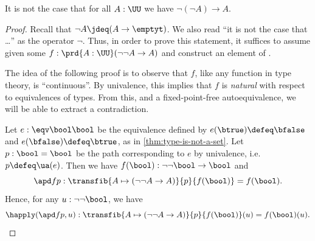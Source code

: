%
\begin{thm}\label{thm:not-dneg}
  It is not the case that for all $A:\UU$ we have $\neg(\neg A) \to A$.
\end{thm}

\begin{proof}
  Recall that $\neg A \jdeq (A\to\emptyt)$.
  We also read ``it is not the case that \dots'' as the operator $\neg$.
  Thus, in order to prove this statement, it suffices to assume given some $f:\prd{A:\UU} (\neg\neg A \to A)$ and construct an element of \emptyt.

  The idea of the following proof is to observe that $f$, like any function in type theory, is ``continuous''.
  By univalence, this implies that $f$ is \emph{natural} with respect to equivalences of types.
  From this, and a fixed-point-free autoequivalence, we will be able to extract a contradiction.

  Let $e:\eqv\bool\bool$ be the equivalence defined by $e(\btrue)\defeq\bfalse$ and $e(\bfalse)\defeq\btrue$, as in \cref{thm:type-is-not-a-set}.
  Let $p:\bool=\bool$ be the path corresponding to $e$ by univalence, i.e.\ $p\defeq \ua(e)$.
  Then we have $f(\bool) : \neg\neg\bool \to\bool$ and
  \[\apd f p : \transfib{A\mapsto (\neg\neg A \to A)}{p}{f(\bool)} = f(\bool).\]
  Hence, for any $u:\neg\neg\bool$, we have
  \[\happly(\apd f p,u) : \transfib{A\mapsto (\neg\neg A \to A)}{p}{f(\bool)}(u) = f(\bool)(u).\]


\end{proof}
